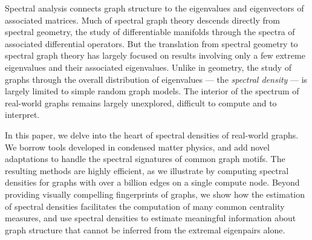 Spectral analysis connects graph structure to the eigenvalues and eigenvectors
of associated matrices.  Much of spectral graph theory descends directly from
spectral geometry, the study of differentiable manifolds through the spectra of
associated differential operators.  But the translation from spectral geometry
to spectral graph theory has largely focused on results involving only a few
extreme eigenvalues and their associated eigenvalues.  Unlike in geometry, the
study of graphs through the overall distribution of eigenvalues --- the {\em
spectral density} --- is largely limited to simple random graph models.  The
interior of the spectrum of real-world graphs remains largely unexplored,
difficult to compute and to interpret.

In this paper, we delve into the heart of spectral densities of real-world
graphs.  We borrow tools developed in condensed matter physics, and add novel
adaptations to handle the spectral signatures of common graph motifs.  The
resulting methods are highly efficient, as we illustrate by computing spectral
densities for graphs with over a billion edges on a single compute node. Beyond
providing visually compelling fingerprints of graphs, we show how the 
estimation of spectral densities facilitates the computation of many common
centrality measures, and use spectral densities to estimate meaningful
information about graph structure that cannot be inferred from the extremal
eigenpairs alone.